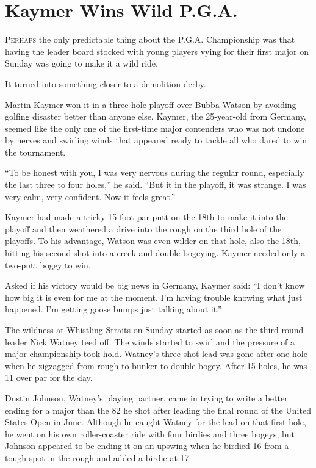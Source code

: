 ﻿\documentclass[12pt]{article}
\begin{document}
\section{Kaymer Wins Wild P.G.A.}

\lettrine{P}{erhaps} the only predictable thing about the P.G.A.
Championship was that having the leader board stocked with young players vying for their first major
on Sunday was going to make it a wild ride.

It turned into something closer to a demolition derby.

Martin Kaymer won it in a three-hole playoff over Bubba Watson by avoiding golfing disaster better
than anyone else. Kaymer, the 25-year-old from Germany, seemed like the only one of the first-time
major contenders who was not undone by nerves and swirling winds that appeared ready to tackle all
who dared to win the tournament.

``To be honest with you, I was very nervous during the regular round, especially the last three to
four holes,'' he said. ``But it in the playoff, it was strange. I was very calm, very confident. Now
it feels great.''

Kaymer had made a tricky 15-foot par putt on the 18th to make it into the playoff and then weathered
a drive into the rough on the third hole of the playoffs. To his advantage, Watson was even wilder
on that hole, also the 18th, hitting his second shot into a creek and double-bogeying. Kaymer needed
only a two-putt bogey to win.

Asked if his victory would be big news in Germany, Kaymer said: ``I don't know how big it is even
for me at the moment. I'm having trouble knowing what just happened. I'm getting goose bumps just
talking about it.''

The wildness at Whistling Straits on Sunday started as soon as the third-round leader Nick Watney
teed off. The winds started to swirl and the pressure of a major championship took hold. Watney's
three-shot lead was gone after one hole when he zigzagged from rough to bunker to double bogey.
After 15 holes, he was 11 over par for the day.

Dustin Johnson, Watney's playing partner, came in trying to write a better ending for a major than
the 82 he shot after leading the final round of the United States Open in June. Although he caught
Watney for the lead on that first hole, he went on his own roller-coaster ride with four birdies and
three bogeys, but Johnson appeared to be ending it on an upswing when he birdied 16 from a tough
spot in the rough and added a birdie at 17.
\end{document}
